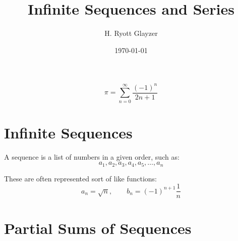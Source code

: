 \documentclass[12pt, letterpaper]{article}
\begin{document}


\title{Infinite Sequences and Series}
\author{H. Ryott Glayzer}
\date{\today}


\maketitle

\[
	\pi = \sum_{{n=0}}^{\infty}{\frac{(-1)^{n}}{2n+1}}
\]

\section{Infinite Sequences}

A sequence is a list of numbers in a given order, such as:
\[
	a_1, a_2, a_3, a_4, a_5, \ldots , a_n
\]

These are often represented sort of like functions:
\[
	a_n = \sqrt{n},\qquad b_n = (-1)^{n+1}\frac{1}{n}
\]





\section{Partial Sums of Sequences}
\end{document}
